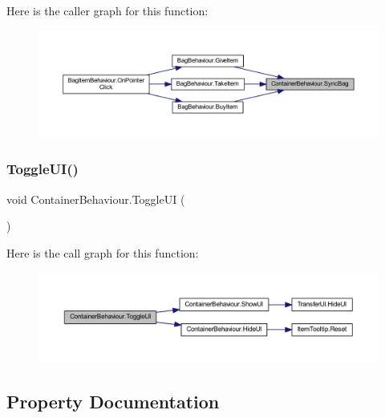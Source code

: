 Here is the caller graph for this function\+:\nopagebreak
\begin{figure}[H]
\begin{center}
\leavevmode
\includegraphics[width=350pt]{class_container_behaviour_aea3c37f67bc244516f307f2c59a27b8f_icgraph}
\end{center}
\end{figure}
\mbox{\label{class_container_behaviour_a12b621fb47599b10bec679acb4cbe24e}} 
\subsubsection{\texorpdfstring{ToggleUI()}{ToggleUI()}}
{\footnotesize\ttfamily void Container\+Behaviour.\+Toggle\+UI (\begin{DoxyParamCaption}{ }\end{DoxyParamCaption})}

Here is the call graph for this function\+:\nopagebreak
\begin{figure}[H]
\begin{center}
\leavevmode
\includegraphics[width=350pt]{class_container_behaviour_a12b621fb47599b10bec679acb4cbe24e_cgraph}
\end{center}
\end{figure}


\subsection{Property Documentation}
\mbox{\label{class_container_behaviour_ab0e91f3cfb15de3442dbef4ac2885c21}} 
